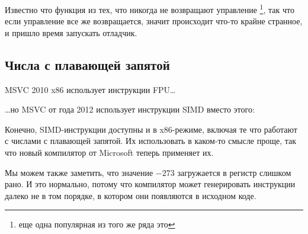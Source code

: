 Известно что функция  из тех, что никогда не возвращают управление
\footnote{еще одна популярная из того же ряда это },
так что если управление все же возвращается, значит происходит что-то крайне странное, и пришло
время запускать отладчик.

\subsection{Числа с плавающей запятой}



MSVC 2010 x86 использует инструкции \ac{FPU}\dots



\dots но MSVC от года 2012 использует инструкции \ac{SIMD} вместо этого:



Конечно, \ac{SIMD}-инструкции доступны и в x86-режиме, включая те что работают
с числами с плавающей запятой.
Их использовать в каком-то смысле проще, так что новый компилятор от Microsoft теперь применяет их.

Мы можем также заметить, что значение $-273$ загружается в регистр  слишком рано.
И это нормально, потому что компилятор может генерировать инструкции далеко не в том порядке, в котором
они появляются в исходном коде.
